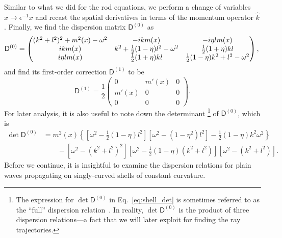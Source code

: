 Similar to what we did for the rod equations, we perform a change of variables $x \to \epsilon^{-1}x$ and recast the spatial derivatives in terms of the momentum operator $\hat{k}$.
Finally, we find the dispersion matrix $\mathsf{D}^{(0)}$ as
%
\begin{equation}
\mathsf{D}^{(0)} =
\begin{pmatrix}
  (k^{2} + l^{2})^{2} + m^{2}(x) - \omega^{2} & -i k m(x) & -i\eta l m(x)\\
  ik m(x) & k^{2} + \frac{1}{2}(1-\eta)l^{2} - \omega^{2} & \frac{1}{2}(1+\eta)kl\\
  i\eta l m(x) & \frac{1}{2}(1 + \eta)kl & \frac{1}{2}(1-\eta)k^{2} + l^{2} - \omega^{2}
\end{pmatrix},\\
\end{equation}
and find its first-order correction $\mathsf{D}^{(1)}$ to be
\begin{equation}
\mathsf{D}^{(1)} =
\frac{1}{2}
\begin{pmatrix}
  0 & m'(x) & 0\\
  m'(x) & 0 & 0\\
  0 & 0 & 0
\end{pmatrix}.
\label{eq:shell_disp_matrices}
\end{equation}
%
For later analysis, it is also useful to note down the determinant%
\footnote{The expression for $\det\mathsf{D}^{(0)}$ in Eq.~\eqref{eq:shell_det} is sometimes referred to as the ``full'' dispersion relation~\cite{sondergaard2002}.  In reality, $\det\mathsf{D}^{(0)}$ is the product of three dispersion relations---a fact that we will later exploit for finding the ray trajectories.}
of $\mathsf{D}^{(0)}$, which is
%
\begin{equation}
  \begin{aligned}
    \det\mathsf{D}^{(0)} &= m^{2}(x)\left\{\left[\omega^{2} - \tfrac{1}{2}(1-\eta)l^{2}\right]\left[\omega^{2}-(1-\eta^{2})l^{2}\right] - \tfrac{1}{2}(1-\eta)k^{2}\omega^{2}\right\} \\
            &\qquad- \left[\omega^{2} - (k^{2} + l^{2})^{2}\right]
            \left[\omega^{2} - \tfrac{1}{2}(1-\eta)(k^{2} + l^{2})\right]
            \left[\omega^{2} - (k^{2} + l^{2})\right].
  \end{aligned}
  \label{eq:shell_det}
\end{equation}
%
Before we continue, it is insightful to examine the dispersion relations for plain waves propagating on singly-curved shells of constant curvature.

